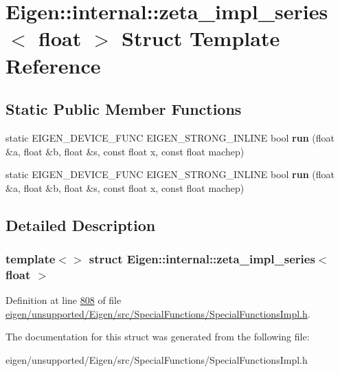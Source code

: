 \hypertarget{struct_eigen_1_1internal_1_1zeta__impl__series_3_01float_01_4}{}\section{Eigen\+:\+:internal\+:\+:zeta\+\_\+impl\+\_\+series$<$ float $>$ Struct Template Reference}
\label{struct_eigen_1_1internal_1_1zeta__impl__series_3_01float_01_4}
\subsection*{Static Public Member Functions}
\begin{DoxyCompactItemize}
\item 
\mbox{\label{struct_eigen_1_1internal_1_1zeta__impl__series_3_01float_01_4_a0bb2cefb05521332c84864bd56a25ca8}} 
static E\+I\+G\+E\+N\+\_\+\+D\+E\+V\+I\+C\+E\+\_\+\+F\+U\+NC E\+I\+G\+E\+N\+\_\+\+S\+T\+R\+O\+N\+G\+\_\+\+I\+N\+L\+I\+NE bool {\bfseries run} (float \&a, float \&b, float \&s, const float x, const float machep)
\item 
\mbox{\label{struct_eigen_1_1internal_1_1zeta__impl__series_3_01float_01_4_a0bb2cefb05521332c84864bd56a25ca8}} 
static E\+I\+G\+E\+N\+\_\+\+D\+E\+V\+I\+C\+E\+\_\+\+F\+U\+NC E\+I\+G\+E\+N\+\_\+\+S\+T\+R\+O\+N\+G\+\_\+\+I\+N\+L\+I\+NE bool {\bfseries run} (float \&a, float \&b, float \&s, const float x, const float machep)
\end{DoxyCompactItemize}


\subsection{Detailed Description}
\subsubsection*{template$<$$>$\newline
struct Eigen\+::internal\+::zeta\+\_\+impl\+\_\+series$<$ float $>$}



Definition at line \hyperlink{eigen_2unsupported_2_eigen_2src_2_special_functions_2_special_functions_impl_8h_source_l00808}{808} of file \hyperlink{eigen_2unsupported_2_eigen_2src_2_special_functions_2_special_functions_impl_8h_source}{eigen/unsupported/\+Eigen/src/\+Special\+Functions/\+Special\+Functions\+Impl.\+h}.



The documentation for this struct was generated from the following file\+:\begin{DoxyCompactItemize}
\item 
eigen/unsupported/\+Eigen/src/\+Special\+Functions/\+Special\+Functions\+Impl.\+h\end{DoxyCompactItemize}

